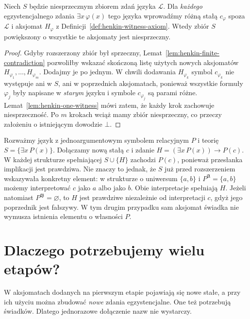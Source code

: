 \begin{lemat}\label{lem:henkin-all-witnesses}
Niech $S$ będzie niesprzecznym zbiorem zdań języka $\mathcal L$. Dla \emph{każdego} egzystencjalnego zdania $\exists x\,\varphi(x)$ tego języka wprowadźmy różną stałą $c_{\varphi}$ spoza $\mathcal L$ i aksjomat $H_{\varphi}$ z Definicji~\ref{def:henkin-witness-axiom}. Wtedy zbiór $S$ powiększony o wszystkie te aksjomaty jest niesprzeczny.
\end{lemat}
\begin{proof}
Gdyby rozszerzony zbiór był sprzeczny, Lemat~\ref{lem:henkin-finite-contradiction} pozwoliłby wskazać skończoną listę użytych nowych aksjomatów $H_{\varphi_1},\ldots,H_{\varphi_m}$. Dodajmy je po jednym. W chwili dodawania $H_{\varphi_k}$ symbol $c_{\varphi_k}$ nie występuje ani w $S$, ani w poprzednich aksjomatach, ponieważ wszystkie formuły $\varphi_j$ były napisane w \emph{starym} języku i symbole $c_{\varphi_j}$ są parami różne. Lemat~\ref{lem:henkin-one-witness} mówi zatem, że każdy krok zachowuje niesprzeczność. Po $m$ krokach wciąż mamy zbiór niesprzeczny, co przeczy założeniu o istniejącym dowodzie $\bot$.
\end{proof}


\begin{przyklad}\label{ex:henkin-witness-47}
Rozważmy język z jednoargumentowym symbolem relacyjnym $P$ i teorię
$S=\{\exists x\,P(x)\}$. Dołączamy nową stałą $c$ i zdanie
$H=(\exists x\,P(x))\to P(c)$. W każdej strukturze spełniającej
$S\cup\{H\}$ zachodzi $P(c)$, ponieważ przesłanka implikacji jest
prawdziwa. Nie znaczy to jednak, że $S$ już przed rozszerzeniem
wskazywała konkretny element: w strukturze o uniwersum $\{a,b\}$
i $P^{\mathfrak A}=\{a,b\}$ możemy interpretować $c$ jako $a$ albo
jako $b$. Obie interpretacje spełniają $H$.
Jeżeli natomiast $P^{\mathfrak B}=\varnothing$, to $H$ jest prawdziwe
niezależnie od interpretacji $c$, gdyż jego poprzednik jest fałszywy.
W tym drugim przypadku sam aksjomat świadka nie wymusza istnienia
elementu o własności $P$.
\end{przyklad}

\section{Dlaczego potrzebujemy wielu etapów?}\label{sec:henkin-stages}
W aksjomatach dodanych na pierwszym etapie pojawiają się nowe stałe, a przy ich użyciu można zbudować \emph{nowe} zdania egzystencjalne. One też potrzebują świadków. Dlatego jednorazowe dołączenie nazw nie wystarczy.


